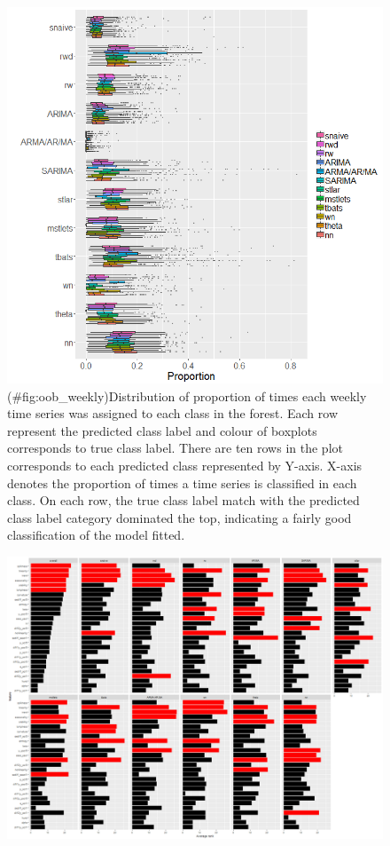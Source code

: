 \documentclass[11pt,a4paper,]{article}
\theoremstyle{definition}
\theoremstyle{definition}
\theoremstyle{definition}
\theoremstyle{remark}
\begin{document}
\begin{figure}
\centering
\includegraphics{figures/oob_weekly-1.png}
\caption{(\#fig:oob\_weekly)Distribution of proportion of times each
weekly time series was assigned to each class in the forest. Each row
represent the predicted class label and colour of boxplots corresponds
to true class label. There are ten rows in the plot corresponds to each
predicted class represented by Y-axis. X-axis denotes the proportion of
times a time series is classified in each class. On each row, the true
class label match with the predicted class label category dominated the
top, indicating a fairly good classification of the model fitted.}
\end{figure}

\newpage

\begin{figure}[h]

{\centering \includegraphics{figures/vi_weekly-1} 

}

\end{figure}
\end{document}
